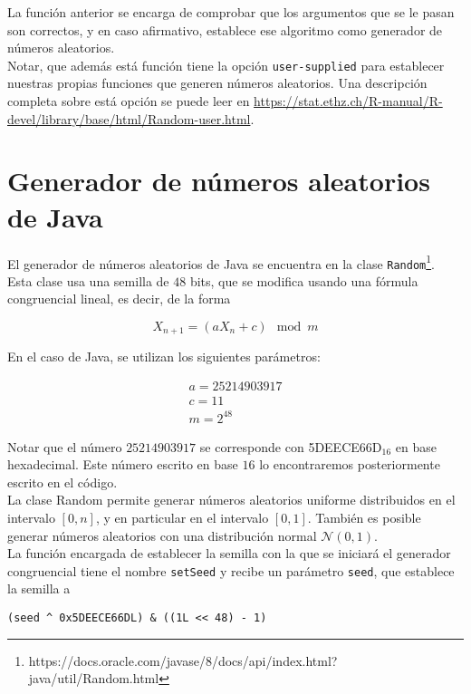 \documentclass[12pt,a4paper,twoside,openright,titlepage,final]{article}
\begin{document}
La función anterior se encarga de comprobar que los argumentos que se le pasan son correctos, y en caso afirmativo, establece ese algoritmo como generador de números aleatorios.\\

Notar, que además está función tiene la opción \texttt{user-supplied} para establecer nuestras propias funciones que generen números aleatorios. Una descripción completa sobre está opción se puede leer en \url{https://stat.ethz.ch/R-manual/R-devel/library/base/html/Random-user.html}.

\section{Generador de números aleatorios de Java}

El generador de números aleatorios de Java se encuentra en la clase \texttt{Random}\footnote{https://docs.oracle.com/javase/8/docs/api/index.html?java/util/Random.html}. Esta clase usa una semilla de $48$ bits, que se modifica usando una fórmula congruencial lineal, es decir, de la forma

\[ X_{n+1} = (a X_n + c) \mod m \]

En el caso de Java, se utilizan los siguientes parámetros:

\[\begin{array}{c}
a = 25214903917\\
c = 11\\
m = 2^{48}
\end{array}\]

Notar que el número $25214903917$ se corresponde con 5DEECE66D$_{16}$ en base hexadecimal. Este número escrito en base $16$ lo encontraremos posteriormente escrito en el código.\\

La clase Random permite generar números aleatorios uniforme distribuidos en el intervalo $[0,n]$, y en particular en el intervalo $[0,1]$. También es posible generar números aleatorios con una distribución normal $\mathcal{N}(0,1)$.\\

La función encargada de establecer la semilla con la que se iniciará el generador congruencial tiene el nombre \texttt{setSeed} y recibe un parámetro \texttt{seed}, que establece la semilla a

\begin{verbatim}
(seed ^ 0x5DEECE66DL) & ((1L << 48) - 1)
\end{verbatim}
\end{document}
